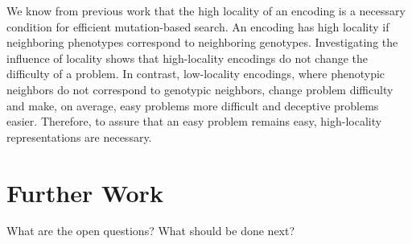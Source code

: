 We know from previous work that the high locality of an encoding is a necessary condition for efficient mutation-based search.
An encoding has high locality if neighboring phenotypes correspond to neighboring genotypes.
Investigating the  influence of locality shows that  high-locality encodings do not change the difficulty of a problem. In contrast, low-locality encodings, where phenotypic neighbors do not correspond to genotypic neighbors, change problem difficulty and make, on average, easy problems more difficult and deceptive problems easier.
Therefore, to assure that  an easy problem remains easy, high-locality representations  are necessary.

\section{Further Work}

What are the open questions? What should be done next?




